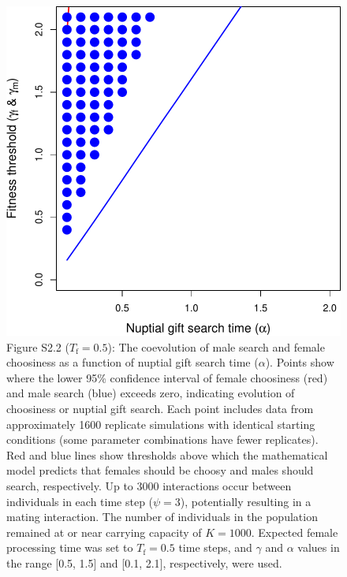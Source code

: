 \documentclass[
]{article}
\begin{document}
\captionsetup{labelformat=default}

\clearpage

\captionsetup{labelformat=empty}

\begin{figure}
\centering
\includegraphics{ms_biorxiv_files/figure-latex/unnamed-chunk-7-1.pdf}
\caption{Figure S2.2 (\(T_{\mathrm{f}} = 0.5\)): The coevolution of male
search and female choosiness as a function of nuptial gift search time
(\(\alpha\)). Points show where the lower 95\% confidence interval of
female choosiness (red) and male search (blue) exceeds zero, indicating
evolution of choosiness or nuptial gift search. Each point includes data
from approximately 1600 replicate simulations with identical starting
conditions (some parameter combinations have fewer replicates). Red and
blue lines show thresholds above which the mathematical model predicts
that females should be choosy and males should search, respectively. Up
to 3000 interactions occur between individuals in each time step
(\(\psi = 3\)), potentially resulting in a mating interaction. The
number of individuals in the population remained at or near carrying
capacity of \(K = 1000\). Expected female processing time was set to
\(T_{\mathrm{f}}=0.5\) time steps, and \(\gamma\) and \(\alpha\) values
in the range {[}0.5, 1.5{]} and {[}0.1, 2.1{]}, respectively, were
used.}
\end{figure}
\end{document}
